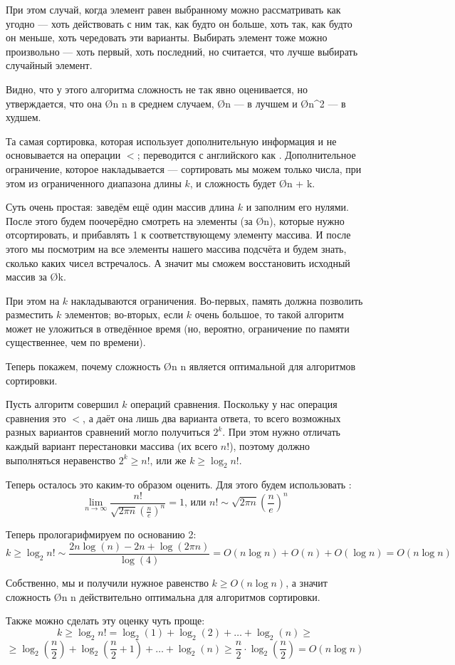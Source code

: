 При этом случай, когда элемент равен выбранному можно рассматривать как угодно — хоть действовать с ним так, как будто он больше, хоть так, как будто он меньше, хоть чередовать эти варианты. Выбирать элемент тоже можно произвольно — хоть первый, хоть последний, но считается, что лучше выбирать случайный элемент.

Видно, что у этого алгоритма сложность не так явно оценивается, но утверждается, что она \O{n \log n} в среднем случаем, \O{n} — в лучшем и \O{n^2} — в худшем.

Та самая сортировка, которая использует дополнительную информация и не основывается на операции $<$; переводится с английского как . Дополнительное ограничение, которое накладывается — сортировать мы можем только числа, при этом из ограниченного диапазона длины $k$, и сложность будет \O{n + k}.

Суть очень простая: заведём ещё один массив длина $k$ и заполним его нулями. После этого будем поочерёдно смотреть на элементы (за \O{n}), которые нужно отсортировать, и прибавлять 1 к соответствующему элементу массива. И после этого мы посмотрим на все элементы нашего массива подсчёта и будем знать, сколько каких чисел встречалось. А значит мы сможем восстановить исходный массив за \O{k}.

При этом на $k$ накладываются ограничения. Во-первых, память должна позволить разместить $k$ элементов; во-вторых, если $k$ очень большое, то такой алгоритм может не уложиться в отведённое время (но, вероятно, ограничение по памяти существеннее, чем по времени).

Теперь покажем, почему сложность \O{n \log n} является оптимальной для алгоритмов сортировки. 

Пусть алгоритм совершил $k$ операций сравнения. Поскольку у нас операция сравнения это $<$, а даёт она лишь два варианта ответа, то всего возможных разных вариантов сравнений могло получиться $2^k$. При этом нужно отличать каждый вариант перестановки массива (их всего $n!$), поэтому должно выполняться неравенство $2^k \geq n!$, или же $k \geq \log_2 n!$.

Теперь осталось это каким-то образом оценить. Для этого будем использовать :
$$\lim\limits_{n\to \infty} \frac{n!}{\sqrt{2\pi n} \left({ \frac{n}{e} }\right)^{n} }=1 \text{, или } n! \sim {\sqrt{2\pi n}} \left({ \frac{n}{e} }\right) ^{n}$$

Теперь прологарифмируем по основанию 2:
$$k \geq \log_2 n! \sim \frac{2n\log(n) - 2n + \log(2 \pi n)}{\log(4)} = O(n \log n) + O(n) + O(\log n) = O(n \log n)$$

Собственно, мы и получили нужное равенство $k \geq O(n \log n)$, а значит сложность \O{n \log n} действительно оптимальна для алгоритмов сортировки.

Также можно сделать эту оценку чуть проще:
$$k \geq \log_2 n! = \log_2(1) + \log_2(2) + \ldots + \log_2(n) \geq $$
$$ \geq \log_2\left(\frac{n}{2}\right) + \log_2\left(\frac{n}{2} + 1\right) + \ldots + \log_2(n) \geq \frac{n}{2} \cdot \log_2 \left( \frac{n}{2} \right) = O(n \log n)$$
